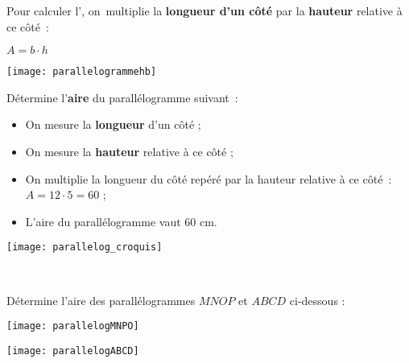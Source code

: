 
\begin{methode*1}

\begin{aconnaitre}
Pour calculer l’, on multiplie la \textbf{\textcolor{H1}{longueur d'un côté}} par la \textbf{\textcolor{C2}{hauteur}} relative à ce côté :
\begin{center} \textbf{$A = b \cdot h$} \end{center}

\begin{center} \texttt{[image: parallelogrammehb]} \end{center}
\end{aconnaitre}

\begin{exemple*1}
Détermine l’\textbf{aire} du parallélogramme suivant :
\begin{minipage}[c]{0.65\textwidth}
\begin{itemize}
 \item On mesure la \textbf{\textcolor{H1}{longueur}} d'un côté ;
 \item On mesure la \textbf{\textcolor{C2}{hauteur}} relative à ce côté ;
 \item On multiplie la longueur du côté repéré par la hauteur relative à ce côté : $A = 12 \cdot 5 = 60$ ;
 \item L'aire du parallélogramme vaut 60 cm.
 \end{itemize}
 \end{minipage} \hfill%
 \begin{minipage}[c]{0.26\textwidth}
 \texttt{[image: parallelog\_croquis]}
 \end{minipage} \\
\end{exemple*1}

\exercice 
Détermine l’aire des parallélogrammes $MNOP$ et $ABCD$ ci-dessous :
\begin{colenumerate}{2}
 \item 
 
 \texttt{[image: parallelogMNPO]}
 \item 
 
 \texttt{[image: parallelogABCD]}
 \end{colenumerate}

\end{methode*1}

